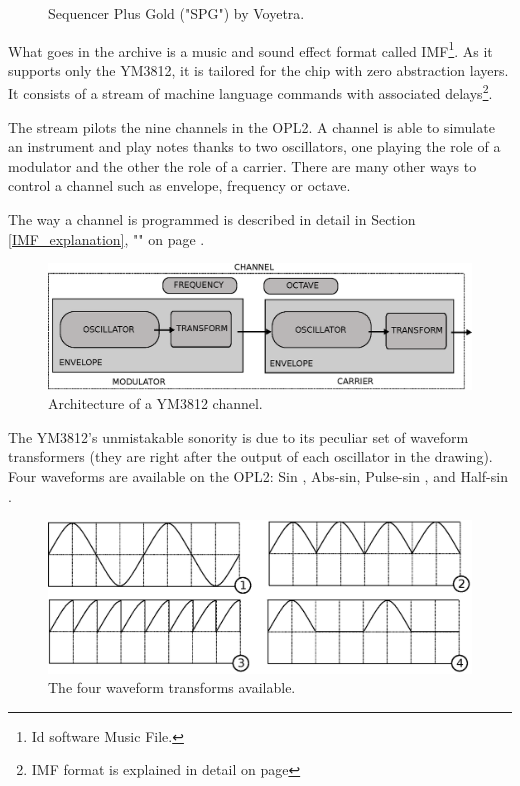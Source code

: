 \documentclass[book.tex]{subfiles}
\begin{document}
\begin{figure}[H]
\centering
\caption{Sequencer Plus Gold ("SPG") by Voyetra.}
\end{figure}


What goes in the  archive is a music and sound effect format called IMF\footnote{Id software Music File.}. As it supports only the YM3812, it is tailored for the chip with zero abstraction layers. It consists of a stream of machine language commands with associated delays\footnote{IMF format is explained in detail on page \pageref{IMF_explanation}}.\\
\par
 The stream pilots the nine channels in the OPL2. A channel is able to simulate an instrument and play notes thanks to two oscillators, one playing the role of a modulator and the other the role of a carrier. There are many other ways to control a channel such as envelope, frequency or octave.\\
\par The way a channel is programmed is described in detail in Section \ref{IMF_explanation}, "" on page \pageref{IMF_explanation}.\\
\par

\pagebreak


\begin{figure}[H]
\centering
 \includegraphics[width=\textwidth]{imgs/drawings/channel.eps}
 \caption{Architecture of a YM3812 channel.}
\end{figure}
\par
{}  The YM3812's unmistakable sonority is due to its peculiar set of waveform transformers (they are right after the output of each oscillator in the drawing). Four waveforms are available on the OPL2: Sin , Abs-sin, Pulse-sin , and Half-sin .
\par
\begin{figure}[H]
\centering
 \includegraphics[width=\textwidth]{imgs/drawings/wave_transform.eps}
 \caption{The four waveform transforms available.}
\end{figure}
\end{document}

